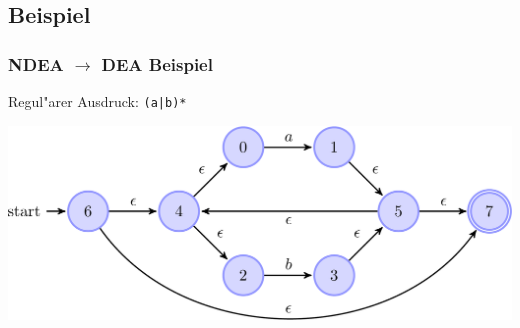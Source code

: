 \documentclass[ignorenonframetext]{beamer}
\begin{document}
\subsection{Beispiel}
\begin{frame}[plain]
    \frametitle{NDEA $\rightarrow$ DEA Beispiel}
    
    Regul"arer Ausdruck: \texttt{(a|b)*}

    \begin{center}
        \includegraphics[scale=0.27]{aorbstar0.pdf}
    \end{center}
\end{frame}
\end{document}
